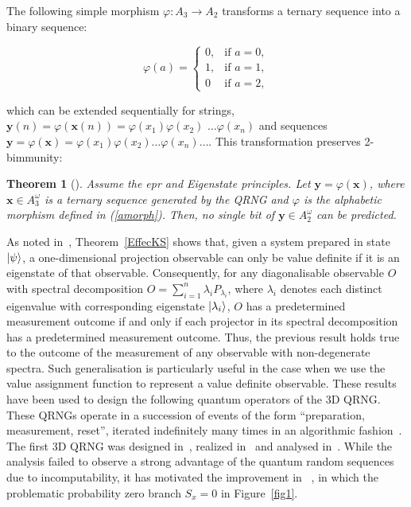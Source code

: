 \documentclass[11pt,a4paper]{article}
\newtheorem{theorem}{Theorem}
\newcommand{\y}{\mathbf{y}}
\begin{document}
The following simple morphism $\varphi \colon A_3 \rightarrow A_2$ transforms a ternary
sequence into a binary sequence:

\begin{equation}
\label{amorph}
\varphi(a)=
\begin{cases}0,&\text{if }a=0,
\\1,&\text{if }a=1,
\\0&\text{if } a=2,\end{cases}
\end{equation}



\noindent  which can be extended sequentially for strings,
  $\mathbf{y}(n)=\varphi(\mathbf{x}(n))= \varphi(x_1)\varphi(x_2)$  $\dots \varphi(x_n)$ and sequences $\mathbf{y}= \varphi(\mathbf{x}) = \varphi(x_1)\varphi(x_2)\dots \varphi(x_n) \dots $. This transformation preserves 2-bimmunity:

  \begin{theorem}[\cite{aguero_trejo_new_2021}]
        Assume the epr and Eigenstate  principles. Let $\mathbf{y}=\varphi (\mathbf{x})$, where $\mathbf{x}\in A_3^{\omega}$ is a ternary sequence generated by the  QRNG  and $\varphi$ is the alphabetic morphism defined in (\ref{amorph}).
Then, no single bit of    $\y \in A_2^{\omega}$  can be predicted.
\end{theorem}




As noted in~\cite{aguero_trejo_new_2021},  Theorem~\ref{EffecKS} shows that, given a system prepared in state $\ket{\psi}$, a one-dimensional projection observable can only be value definite if it is an eigenstate of that observable. Consequently,  for any diagonalisable observable $O$ with spectral decomposition $O=\sum_{i=1}^n\lambda_{i}P_{\lambda_{i}}$, where $\lambda_{i}$ denotes each distinct eigenvalue with corresponding eigenstate $\ket{\lambda_{i}}$,  $O$ has a predetermined measurement outcome if and only if each projector in its spectral decomposition has a predetermined measurement outcome. Thus,  the  previous result holds true  to the outcome of the measurement of any observable with non-degenerate spectra.
Such generalisation is  particularly useful in the case when we use the value assignment function to represent  a  value definite observable.
These results have been used  to design the following quantum operators of the 3D QRNG.  These QRNGs operate in a  succession of events of the form ``preparation,  measurement,
 reset'', iterated indefinitely many times in an algorithmic fashion~\cite{abbott2012strongrandomness}. The first 3D QRNG was designed in~\cite{abbott2012strongrandomness}, realized in~\cite{PhysRevLett.119.240501} and analysed in~\cite{Abbott_2019}. While the analysis failed to observe a strong advantage of the quantum random sequences due to incomputability, it has motivated the improvement in ~\cite{aguero_trejo_new_2021}, in which  the problematic probability zero  branch  $S_x=0$  in Figure~\ref{fig1}.
\end{document}
